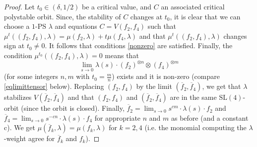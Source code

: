 \documentclass[11pt]{amsart}
\numberwithin{equation}{section}
\theoremstyle{plain}
\theoremstyle{remark}
\theoremstyle{definition}
\newcommand{\SL}{\mathrm{SL}}
\begin{document}
\begin{proof}
%
Let $t_0\in(\delta,1/2)$ be a critical value, and $C$ an associated critical polystable orbit. Since, the stability of $C$ changes at $t_0$, it is clear that we can choose a $1$-PS $\lambda$ and equations $C=V(f_2,f_4)$ such that $\mu^t((f_2,f_4),\lambda)=\mu(f_2,\lambda)+t\mu(f_4,\lambda)$ and that $\mu^t((f_2,f_4),\lambda)$ changes sign at $t_0\neq 0$. It follows that conditions \eqref{nonzero} are satisfied. 
Finally, the condition $\mu^{t_0}((f_2,f_4),\lambda)=0$ means that 
$$\lim_{s\to 0} \lambda(s)\cdot (f_2)^{\otimes n} \otimes (f_4)^{\otimes m}$$
(for some integers $n,m$ with $t_0=\frac{m}{n}$) exists and it is non-zero (compare \eqref{eqlimittensor} below). Replacing $(f_2,f_4)$ by the limit $(\overline f_2,\overline f_4)$,  we get that $\lambda$ stabilizes $V(\overline f_2,\overline f_4)$ and that $(f_2,f_4)$ and $(\overline f_2,\overline f_4)$ are in the same $\SL(4)$-orbit (since the orbit is closed). Finally, $\overline f_2=\lim_{s\to 0} s^{c m}\cdot \lambda(s)\cdot f_2$ and $\overline f_4=\lim_{s\to 0} s^{-cn}\cdot \lambda(s)\cdot f_4$ for appropriate $n$ and $m$  as before (and a constant c). We get $\mu(\overline f_k,\lambda)=\mu(f_k,\lambda)$ for $k=2,4$ (i.e. the monomial computing the $\lambda$-weight agree for $\overline f_k$ and $f_k$). 
\end{proof}
%
\end{document}

